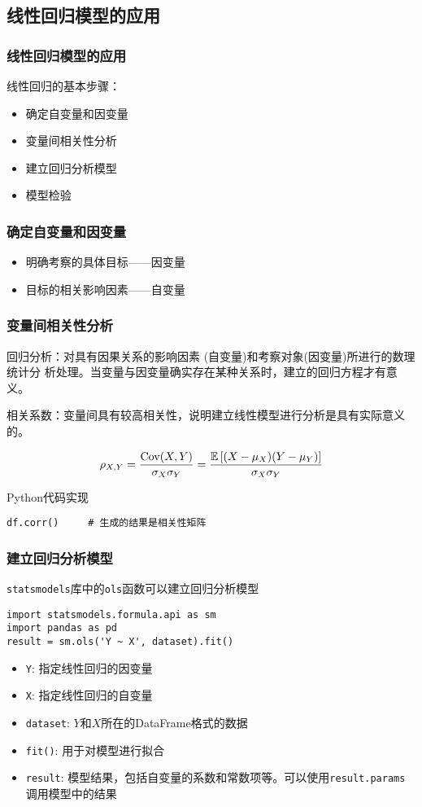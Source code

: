 \documentclass[t]{beamer}
\newcommand{\E}{\mathbb{E}}
\begin{document}
\subsection{线性回归模型的应用}
\begin{frame}
    \frametitle{线性回归模型的应用}
  线性回归的基本步骤：
\begin{itemize}
  \item  确定自变量和因变量
  \item  变量间相关性分析
\item  建立回归分析模型
\item  模型检验
\end{itemize}    

\end{frame}

\begin{frame}
    \frametitle{ 确定自变量和因变量}
\begin{itemize}
  \item 明确考察的具体目标——因变量
  \item 目标的相关影响因素——自变量
\end{itemize}
    

\end{frame}


\begin{frame}[fragile]
    \frametitle{变量间相关性分析}
回归分析：对具有因果关系的影响因素 (自变量)和考察对象(因变量)所进行的数理统计分
    析处理。当变量与因变量确实存在某种关系时，建立的回归方程才有意义。

    相关系数：变量间具有较高相关性，说明建立线性模型进行分析是具有实际意义的。

\[\rho_{X,Y}=\frac{{\rm Cov}(X,Y)}{\sigma_X \sigma_Y}=\frac{\E\left[(X-\mu_X)(Y-\mu_Y)\right]}{\sigma_X \sigma_Y}\]
\begin{block}{Python代码实现}
  \begin{lstlisting}
df.corr()     # 生成的结果是相关性矩阵
\end{lstlisting}  
\end{block}
  
\end{frame}


\begin{frame}[fragile]
    \frametitle{建立回归分析模型}
    \verb|statsmodels|库中的\verb|ols|函数可以建立回归分析模型
\begin{lstlisting}
import statsmodels.formula.api as sm
import pandas as pd
result = sm.ols('Y ~ X', dataset).fit()
\end{lstlisting}
\begin{itemize}
  \item   \verb|Y|: 指定线性回归的因变量
  \item \verb|X|: 指定线性回归的自变量
  \item \verb|dataset|: $Y$和$X$所在的DataFrame格式的数据
  \item \verb|fit()|: 用于对模型进行拟合
  \item \verb|result|: 模型结果，包括自变量的系数和常数项等。可以使用\verb|result.params|调用模型中的结果
\end{itemize}
\end{frame}
\end{document}
